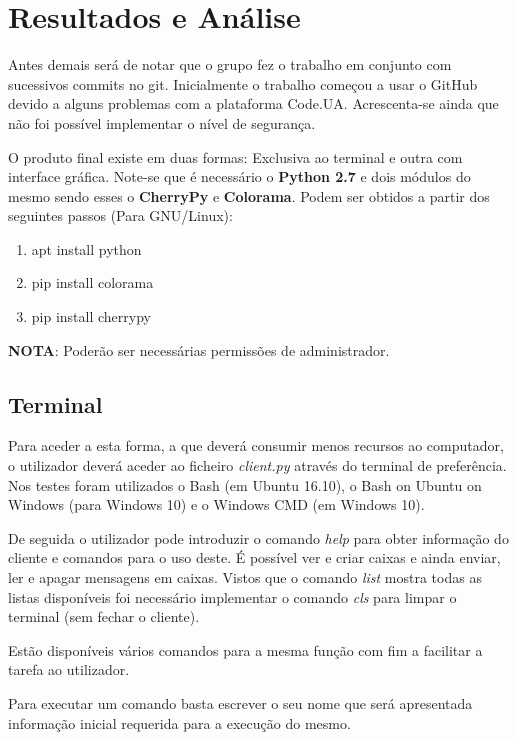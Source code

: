 \documentclass{report}
\begin{document}
\chapter{Resultados e Análise}
\label{chap.res}

Antes demais será de notar que o grupo fez o trabalho em conjunto com sucessivos commits no git. Inicialmente o trabalho começou a usar o GitHub devido a alguns problemas com a plataforma Code.UA. Acrescenta-se ainda que não foi possível implementar o nível de segurança.

O produto final existe em duas formas: Exclusiva ao terminal e outra com interface gráfica. Note-se que é necessário o \textbf{Python 2.7} e dois módulos do mesmo sendo esses o \textbf{CherryPy} e \textbf{Colorama}. Podem ser obtidos a partir dos seguintes passos (Para GNU/Linux):

\begin{enumerate}
\item apt install python
\item pip install colorama
\item pip install cherrypy
\end{enumerate}

\textbf{NOTA}: Poderão ser necessárias permissões de administrador.

\section{Terminal}

Para aceder a esta forma, a que deverá consumir menos recursos ao computador, o utilizador deverá aceder ao ficheiro \textit{client.py} através do terminal de preferência. Nos testes foram utilizados o Bash (em Ubuntu 16.10), o Bash on Ubuntu on Windows (para Windows 10) e o Windows CMD (em Windows 10).

De seguida o utilizador pode introduzir o comando \textit{help} para obter informação do cliente e comandos para o uso deste. É possível ver e criar caixas e ainda enviar, ler e apagar mensagens em caixas. Vistos que o comando \textit{list} mostra todas as listas disponíveis foi necessário implementar o comando \textit{cls} para limpar o terminal (sem fechar o cliente).

Estão disponíveis vários comandos para a mesma função com fim a facilitar a tarefa ao utilizador.

Para executar um comando basta escrever o seu nome que será apresentada informação inicial requerida para a execução do mesmo.
\end{document}

